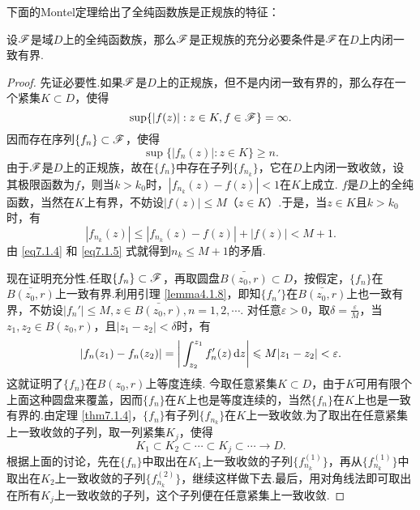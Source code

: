 下面的Montel定理给出了全纯函数族是正规族的特征：
\begin{theorem}\label{thm7.1.5}
  设$\mathscr F$是域$D$上的全纯函数族，那么$\mathscr F$是正规族的充分必要条件是$\mathscr F$在$D$上内闭一致有界.
\end{theorem}
\begin{proof}
  先证必要性.如果$\mathscr F$是$D$上的正规族，但不是内闭一致有界的，那么存在一个紧集$K\subset D$，使得
  \[
    \sup\{|f(z)|:z\in K,f\in\mathscr F\} = \infty.
  \]
  因而存在序列$\{f_n\}\subset \mathscr F$，使得
  \begin{equation}\label{eq7.1.4}
    \sup\{|f_n(z)|:z\in K\}\ge n.
  \end{equation}
  由于$\mathscr F$是$D$上的正规族，故在$\{f_n\}$中存在子列$\{f_{n_k}\}$，它在$D$上内闭一致收敛，设其极限函数为$f$，则当$k>k_0$时，$|f_{n_k}(z)-f(z)|<1$在$K$上成立. $f$是$D$上的全纯函数，当然在$K$上有界，不妨设$|f(z)|\le M$（$z\in K$）.于是，当$z\in K$且$k>k_0$时，有
  \begin{equation}\label{eq7.1.5}
    |f_{n_k}(z)| \le |f_{n_k}(z)-f(z)|+|f(z)|<M+1.
  \end{equation}
  由 \eqref{eq7.1.4} 和 \eqref{eq7.1.5} 式就得到$n_k\le M+1$的矛盾.

  现在证明充分性.任取$\{f_n\}\subset\mathscr F$，再取圆盘$\bar{B(z_0,r)}\subset D$，按假定，$\{f_n\}$在$\bar{B(z_0,r)}$上一致有界.利用引理 \ref{lemma4.1.8}，即知$\{f_n'\}$在$\bar{B(z_0,r)}$上也一致有界，不妨设$|f_n'|\le M,z\in\bar{B(z_0,r)},n=1,2,\cdots$. 对任意$\varepsilon>0$，取$\delta=\frac\varepsilon M$，当$z_1,z_2\in B(z_0,r)$，且$|z_1-z_2|<\delta$时，有
  \[
    |f_n(z_1)-f_n(z_2)| = \bigg|\int_{z_2}^{z_1}f_n'(z)\mathop{}\!\mathrm dz\bigg| \leqslant M|z_1-z_2| < \varepsilon.
  \]
  这就证明了$\{f_n\}$在$B(z_0,r)$上等度连续. 今取任意紧集$K\subset D$，由于$K$可用有限个上面这种圆盘来覆盖，因而$\{f_n\}$在$K$上也是等度连续的，当然$\{f_n\}$在$K$上也是一致有界的.由定理 \ref{thm7.1.4}，$\{f_n\}$有子列$\{f_{n_k}\}$在$K$上一致收敛.为了取出在任意紧集上一致收敛的子列，取一列紧集$K_j$，使得
  \[
    K_1\subset K_2 \subset\cdots\subset K_j\subset\cdots\to D.
  \]
  根据上面的讨论，先在$\{f_n\}$中取出在$K_1$上一致收敛的子列$\{f_{n_k}^{(1)}\}$，再从$\{f_{n_k}^{(1)}\}$中取出在$K_2$上一致收敛的子列$\{f_{n_k}^{(2)}\}$，继续这样做下去.最后，用对角线法即可取出在所有$K_j$上一致收敛的子列，这个子列便在任意紧集上一致收敛.
\end{proof}

